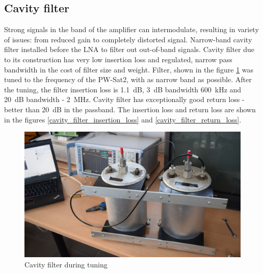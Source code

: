 \subsection{Cavity filter}
Strong signals in the band of the amplifier can intermodulate, resulting in variety of issues: from reduced gain to completely distorted signal. Narrow-band cavity filter installed before the LNA to filter out out-of-band signals. Cavity filter due to its construction has very low insertion loss and regulated, narrow pass bandwidth in the cost of filter size and weight. Filter, shown in the figure \ref{cavity_filter_during_tuning} was tuned to the frequency of the PW-Sat2, with as narrow band as possible. After the tuning, the filter insertion loss is \SI{1.1}{\dB}, \SI{3}{\dB} bandwidth \SI{600}{\kHz} and \SI{20}{\dB} bandwidth - \SI{2}{\MHz}. Cavity filter has exceptionally good return loss - better than \SI{20}{\dB} in the passband. The insertion loss and return loss are shown in the figures \ref{cavity_filter_insertion_loss} and \ref{cavity_filter_return_loss}.

\begin{figure}
    \centering
    \includegraphics[width=0.5\paperwidth]{img/7/cavity_filter_during_tuning.jpg}
    \caption{Cavity filter during tuning}
    \label{cavity_filter_during_tuning}
\end{figure}

